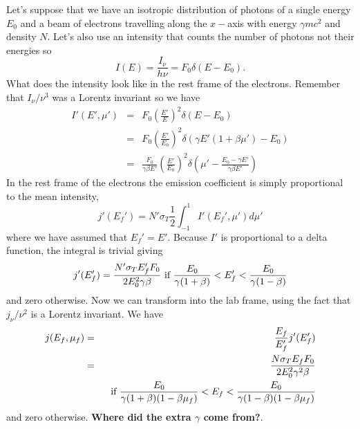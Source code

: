 Let's suppose that we have an isotropic distribution of photons of a
single energy $E_0$ and a beam of electrons travelling along the
$x-$axis with energy $\gamma m c^2$ and density $N$.  Let's also use
an intensity that counts the number of photons not their energies so
\begin{equation}
I(E) = \frac{I_\nu}{h \nu} = F_0 \delta (E-E_0).
\label{eq:419}
\end{equation}
What does the intensity look like in the rest frame of the electrons.
Remember that $I_\nu/\nu^3$ was a Lorentz invariant so we have
\begin{eqnarray}
I'(E',\mu') &=& F_0 \left (\frac{E'}{E}\right)^2 \delta (E-E_0)\\
& =& F_0
\left (\frac{E'}{E_0}\right)^2 \delta (\gamma E' (1+\beta\mu') -E_0) \\
&=&  \frac{F_0}{\gamma\beta E'} 
\left (\frac{E'}{E_0}\right)^2 \delta \left (\mu' - \frac{E_0-\gamma
  E'}{\gamma\beta E'} \right )
\label{eq:420}
\end{eqnarray}
In the rest frame of the electrons the emission coefficient is simply
proportional to the mean intensity,
\begin{equation}
j'(E_f') = N' \sigma_T \frac{1}{2} \int_{-1}^1 I'(E_f',\mu') d \mu'
\label{eq:421}
\end{equation}
where we have assumed that $E_f'=E'$.  Because $I'$ is proportional to
a delta function, the integral is trivial giving
\begin{equation}
j'(E_f') = \frac{N' \sigma_T E_f' F_0}{2 E_0^2  \gamma
  \beta}~\hbox{\rm if}~ \frac{E_0}{\gamma (1+\beta)} < E_f' < \frac{E_0}{\gamma(1-\beta)}
\label{eq:422}
\end{equation}
and zero otherwise.  Now we can transform into the lab frame, using
the fact that $j_\nu/\nu^2$ is a Lorentz invariant. We have
\begin{eqnarray}
j(E_f,\mu_f) &=& \frac{E_f}{E_f'} j'(E_f') \\
&=& \frac{N \sigma_T E_f F_0}{2 E_0^2 \gamma^2 \beta}  \\ 
& &~~\hbox{\rm if}~
\frac{E_0}{\gamma (1+\beta)(1-\beta \mu_f)} < E_f <
\frac{E_0}{\gamma(1-\beta)(1-\beta \mu_f)} \nonumber
\label{eq:423}
\end{eqnarray}
and zero otherwise. {\bf Where did the extra $\gamma$ come from?}.

